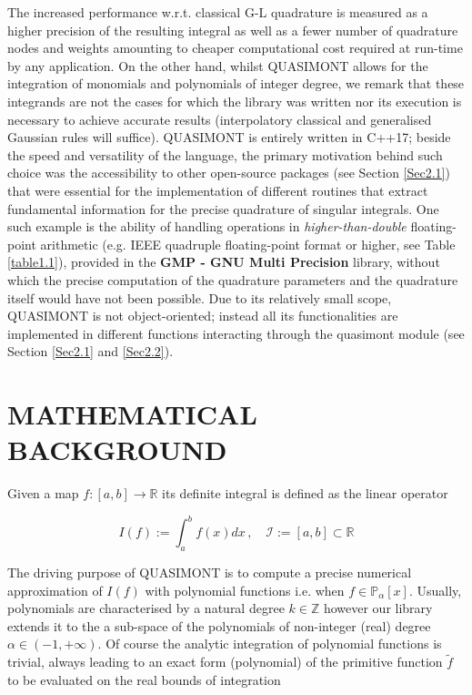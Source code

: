 \documentclass[a4paper, twosided]{book}
\begin{document}
\noindent
The increased performance w.r.t. classical G-L quadrature is measured as a higher precision of the resulting integral as well as a fewer number of quadrature nodes and weights amounting to cheaper computational cost required at run-time by any application. On the other hand, whilst QUASIMONT allows for the integration of monomials and polynomials of integer degree, we remark that these integrands are not the cases for which the library was written nor its execution is necessary to achieve accurate results (interpolatory classical and generalised Gaussian rules will suffice). QUASIMONT is entirely written in C++17; beside the speed and versatility of the language, the primary motivation behind such choice was the accessibility to other open-source packages (see Section \ref{Sec2.1}) that were essential for the implementation of different routines that extract fundamental information for the precise quadrature of singular integrals. One such example is the ability of handling operations in \textsl{higher-than-double} floating-point arithmetic (e.g. IEEE quadruple floating-point format or higher, see Table \ref{table1.1}), provided in the \color{poliDarkBlue} \textbf{GMP - GNU Multi Precision} \color{black} library, without which the precise computation of the quadrature parameters and the quadrature itself would have not been possible. Due to its relatively small scope, QUASIMONT is not object-oriented; instead all its functionalities are implemented in different functions interacting through the \colorbox{poliGrayBlue}{quasimont} \color{black} module (see Section \ref{Sec2.1} and \ref{Sec2.2}).

\section[Mathematical background]{\changefont MATHEMATICAL BACKGROUND}\label{Sec1.2}

\noindent
Given a map $f:[a,b]\to\mathbb{R}$ its definite integral is defined as the linear operator

\begin{equation}\label{eq1.1}
    I(f):=\int_{a}^{b}f(x)dx\,,\quad\mathcal{I}:=[a,b]\subset\mathbb{R}
\end{equation}

\noindent
The driving purpose of QUASIMONT is to compute a precise numerical approximation of $I(f)$ with polynomial functions i.e. when $f\in\mathbb{P}_{\alpha}[x]$. Usually, polynomials are characterised by a natural degree $k\in\mathbb{Z}$ however our library extends it to the a sub-space of the polynomials of non-integer (real) degree $\alpha\in(-1,+\infty)$. Of course the analytic integration of polynomial functions is trivial, always leading to an exact form (polynomial) of the primitive function $\tilde{f}$ to be evaluated on the real bounds of integration
\end{document}
